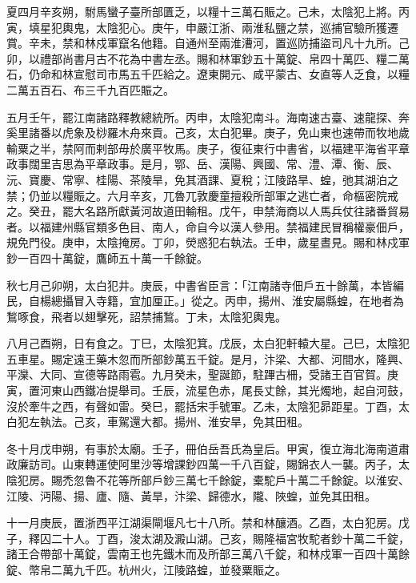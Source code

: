 \begin{pinyinscope}
 夏四月辛亥朔，駙馬蠻子臺所部匱乏，以糧十三萬石賑之。己未，太陰犯上將。丙寅，填星犯輿鬼，太陰犯心。庚午，申嚴江浙、兩淮私鹽之禁，巡捕官驗所獲遷賞。辛未，禁和林戍軍竄名他籍。自通州至兩淮漕河，置巡防捕盜司凡十九所。己卯，以禮部尚書月古不花為中書左丞。賜和林軍鈔五十萬錠、帛四十萬匹、糧二萬石，仍命和林宣慰司市馬五千匹給之。遼東開元、咸平蒙古、女直等人乏食，以糧二萬五百石、布三千九百匹賑之。



 五月壬午，罷江南諸路釋教總統所。丙申，太陰犯南斗。海南速古臺、速龍探、奔奚里諸番以虎象及桫羅木舟來貢。己亥，太白犯畢。庚子，免山東也速帶而牧地歲輸粟之半，禁阿而剌部毋於廣平牧馬。庚子，復征東行中書省，以福建平海省平章政事闊里吉思為平章政事。是月，鄂、岳、漢陽、興國、常、澧、潭、衡、辰、沅、寶慶、常寧、桂陽、茶陵旱，免其酒課、夏稅；江陵路旱、蝗，弛其湖泊之禁；仍並以糧賑之。六月辛亥，兀魯兀敦慶童擅殺所部軍之逃亡者，命樞密院戒之。癸丑，罷大名路所獻黃河故道田輸租。戊午，申禁海商以人馬兵仗往諸番貿易者。以福建州縣官類多色目、南人，命自今以漢人參用。禁福建民冒稱權豪佃戶，規免門役。庚申，太陰掩房。丁卯，熒惑犯右執法。壬申，歲星晝見。賜和林戍軍鈔一百四十萬錠，鷹師五十萬一千餘錠。



 秋七月己卯朔，太白犯井。庚辰，中書省臣言：「江南諸寺佃戶五十餘萬，本皆編民，自楊總攝冒入寺籍，宜加厘正。」從之。丙申，揚州、淮安屬縣蝗，在地者為鶖啄食，飛者以翅擊死，詔禁捕鶖。丁未，太陰犯輿鬼。



 八月己酉朔，日有食之。丁巳，太陰犯箕。戊辰，太白犯軒轅大星。己巳，太陰犯五車星。賜定遠王藥木忽而所部鈔萬五千錠。是月，汴梁、大都、河間水，隆興、平灤、大同、宣德等路雨雹。九月癸未，聖誕節，駐蹕古柵，受諸王百官賀。庚寅，置河東山西鐵冶提舉司。壬辰，流星色赤，尾長丈餘，其光燭地，起自河鼓，沒於牽牛之西，有聲如雷。癸巳，罷括宋手號軍。乙未，太陰犯昴距星。丁酉，太白犯左執法。己亥，車駕還大都。揚州、淮安旱，免其田租。



 冬十月戊申朔，有事於太廟。壬子，冊伯岳吾氏為皇后。甲寅，復立海北海南道肅政廉訪司。山東轉運使阿里沙等增課鈔四萬一千八百錠，賜錦衣人一襲。丙子，太陰犯房。賜禿忽魯不花等所部戶鈔三萬七千餘錠，橐駝戶十萬二千餘錠。以淮安、江陵、沔陽、揚、廬、隨、黃旱，汴梁、歸德水，隴、陜蝗，並免其田租。



 十一月庚辰，置浙西平江湖渠閘堰凡七十八所。禁和林釀酒。乙酉，太白犯房。戊子，釋囚二十人。丁酉，浚太湖及澱山湖。己亥，賜隆福宮牧駝者鈔十萬二千錠，諸王合帶部十萬錠，雲南王也先鐵木而及所部三萬八千錠，和林戍軍一百四十萬餘錠、幣帛二萬九千匹。杭州火，江陵路蝗，並發粟賑之。




\end{pinyinscope}
